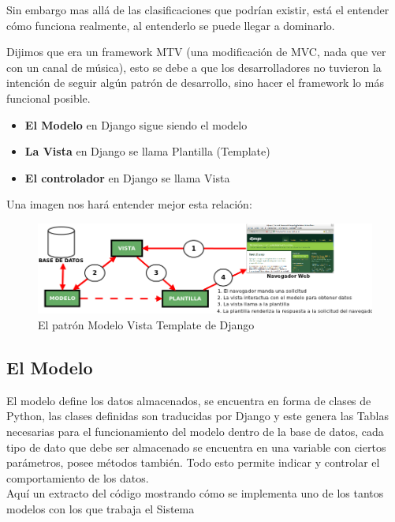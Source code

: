 Sin embargo mas allá de las clasificaciones que podrían existir, está el entender cómo funciona realmente, al entenderlo se puede llegar a dominarlo.

Dijimos que era un framework MTV (una modificación de MVC, nada que ver con un canal de música), esto se debe a que los desarrolladores no tuvieron la  intención de seguir algún patrón de desarrollo, sino hacer el framework lo más funcional posible.

\begin{itemize}
    \item {\bfseries  El Modelo} en Django sigue siendo el modelo
    \item {\bfseries La Vista} en Django se llama Plantilla (Template)
    \item {\bfseries El controlador} en Django se llama Vista
\end{itemize}

Una imagen nos hará entender mejor esta relación:

\begin{figure}[h]
    \centering
    \includegraphics[scale=0.5]{resourse/esquema-mtv.png}
    \caption{El patrón Modelo Vista Template de Django}
    \label{fig:04}
\end{figure}   



\subsection{El Modelo}

El modelo define los datos almacenados, se encuentra en forma de clases de Python, las clases definidas son traducidas por Django y este genera las Tablas necesarias para el funcionamiento del modelo dentro de la base de datos, cada tipo de dato que debe ser almacenado se encuentra en una variable con ciertos parámetros, posee métodos también. Todo esto permite indicar y controlar el comportamiento de los datos.\\[0.1cm]

Aquí un extracto del código mostrando cómo se implementa uno de los tantos modelos con los que trabaja el Sistema\\[0.3cm]


